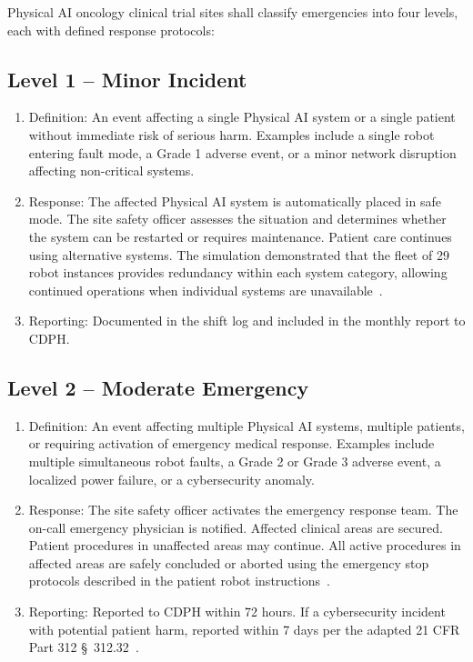 \documentclass[11pt,letterpaper]{article}
\begin{document}
Physical AI oncology clinical trial sites shall classify emergencies into four
levels, each with defined response protocols:

\subsection{Level 1 -- Minor Incident}

\begin{enumerate}[label=(\alph*)]
\item Definition: An event affecting a single Physical AI system or a single
  patient without immediate risk of serious harm. Examples include a single
  robot entering fault mode, a Grade 1 adverse event, or a minor network
  disruption affecting non-critical systems.

\item Response: The affected Physical AI system is automatically placed in safe
  mode. The site safety officer assesses the situation and determines whether
  the system can be restarted or requires maintenance. Patient care continues
  using alternative systems. The simulation demonstrated that the fleet of 29
  robot instances provides redundancy within each system category, allowing
  continued operations when individual systems are
  unavailable~\cite{newtrial2026}.

\item Reporting: Documented in the shift log and included in the monthly report
  to CDPH.
\end{enumerate}

\subsection{Level 2 -- Moderate Emergency}

\begin{enumerate}[label=(\alph*)]
\item Definition: An event affecting multiple Physical AI systems, multiple
  patients, or requiring activation of emergency medical response. Examples
  include multiple simultaneous robot faults, a Grade 2 or Grade 3 adverse
  event, a localized power failure, or a cybersecurity anomaly.

\item Response: The site safety officer activates the emergency response team.
  The on-call emergency physician is notified. Affected clinical areas are
  secured. Patient procedures in unaffected areas may continue. All active
  procedures in affected areas are safely concluded or aborted using the
  emergency stop protocols described in the patient robot
  instructions~\cite{patientinstructions2026}.

\item Reporting: Reported to CDPH within 72 hours. If a cybersecurity incident
  with potential patient harm, reported within 7 days per the adapted 21 CFR
  Part 312 \S~312.32~\cite{cfr312adapt}.
\end{enumerate}
\end{document}
